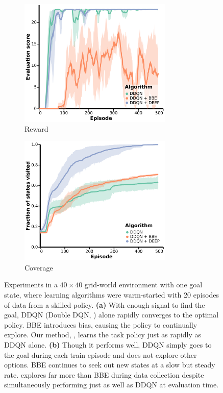 \begin{figure}[h]
    \centering
    \begin{subfigure}[b]{0.49\textwidth}
        \centering
        \includegraphics[width=0.8\textwidth]{figures/deep/grid40_warmstart.pdf}
        \caption{Reward}
    \end{subfigure}
    \hfill
    \begin{subfigure}[b]{0.49\textwidth}
        \centering
        \includegraphics[width=0.8\textwidth]{figures/deep/grid40_warmstart_visits.pdf}
        \caption{Coverage}
    \end{subfigure}
    \caption{Experiments in a $40 \times 40$ grid-world environment with one goal state, where learning algorithms were warm-started with 20 episodes of data from a skilled policy.
    \textbf{(a)} With enough signal to find the goal, DDQN (Double DQN, \citet{Hasselt2016DeepRL}) alone rapidly converges to the optimal policy. BBE introduces bias, causing the policy to continually explore. Our method, \algshort{}, learns the task policy just as rapidly as DDQN alone.
    \textbf{(b)} Though it performs well, DDQN simply goes to the goal during each train episode and does not explore other options. BBE continues to seek out new states at a slow but steady rate. \algshort{} explores far more than BBE during data collection despite simultaneously performing just as well as DDQN at evaluation time.}
    \label{fig:gridworld_warmstart}
\end{figure}

